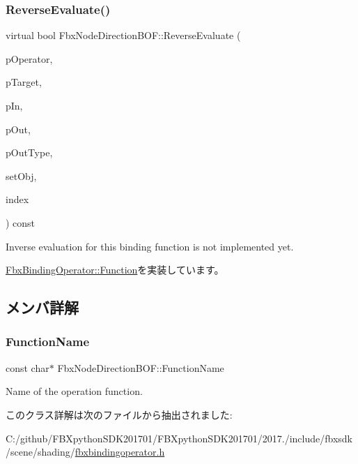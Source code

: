 \subsubsection{\texorpdfstring{Reverse\+Evaluate()}{ReverseEvaluate()}}
{\footnotesize\ttfamily virtual bool Fbx\+Node\+Direction\+B\+O\+F\+::\+Reverse\+Evaluate (\begin{DoxyParamCaption}\item[{const \hyperlink{class_fbx_binding_operator}{Fbx\+Binding\+Operator} $\ast$}]{p\+Operator,  }\item[{const \hyperlink{class_fbx_object}{Fbx\+Object} $\ast$}]{p\+Target,  }\item[{const void $\ast$}]{p\+In,  }\item[{void $\ast$$\ast$}]{p\+Out,  }\item[{\hyperlink{fbxpropertytypes_8h_a73913a5ddfb20e57c6f25e9e6784bd92}{E\+Fbx\+Type} $\ast$}]{p\+Out\+Type,  }\item[{bool}]{set\+Obj,  }\item[{int}]{index }\end{DoxyParamCaption}) const\hspace{0.3cm}{\ttfamily [virtual]}}



Inverse evaluation for this binding function is not implemented yet. 



\hyperlink{class_fbx_binding_operator_1_1_function_a9bbeec993a6e453a6569e7f40a85fd52}{Fbx\+Binding\+Operator\+::\+Function}を実装しています。



\subsection{メンバ詳解}
\mbox{\label{class_fbx_node_direction_b_o_f_a653e830c1b1480a48f55cd980fe54f91}} 
\subsubsection{\texorpdfstring{Function\+Name}{FunctionName}}
{\footnotesize\ttfamily const char$\ast$ Fbx\+Node\+Direction\+B\+O\+F\+::\+Function\+Name\hspace{0.3cm}{\ttfamily [static]}}



Name of the operation function. 



このクラス詳解は次のファイルから抽出されました\+:\begin{DoxyCompactItemize}
\item 
C\+:/github/\+F\+B\+Xpython\+S\+D\+K201701/\+F\+B\+Xpython\+S\+D\+K201701/2017./include/fbxsdk/scene/shading/\hyperlink{fbxbindingoperator_8h}{fbxbindingoperator.\+h}\end{DoxyCompactItemize}
